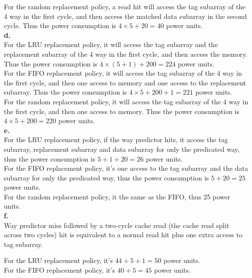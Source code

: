 \documentclass{article}
\begin{document}
For the random replacement policy, a read hit will access the tag subarray of the 4 way in the first cycle, and then access the matched data subarray in the second cycle. Thus the power consumption is $4\times5+20=40$ power units.\\

\noindent\textbf{d.}\\
\indent For the LRU replacement policy, it will access the tag subarray and the replacement subarray of the 4 way in the first cycle, and then access the memory. Thus the power consumption is $4\times(5+1)+200=224$ power units.\\

For the FIFO replacement policy, it will access the tag subarray of the 4 way in the first cycle, and then one access to memory and one access to the replacement subarray. Thus the power consumption is $4\times5+200+1=221$ power units.\\

For the random replacement policy, it will access the tag subarray of the 4 way in the first cycle, and then one access to memory. Thus the power consumption is $4\times5+200=220$ power units.\\

\noindent\textbf{e.}\\
\indent For the LRU replacement policy, if the way predictor hits, it access the tag subarray, replacement subarray and data subarray for only the predicated way, thus the power consumption is $5+1+20=26$ power units.\\

For the FIFO replacement policy, it's one access to the tag subarray and the data subarray for only the predicated way, thus the power consumption is $5+20=25$ power units.\\

For the random replacement policy, it the same as the FIFO, thus 25 power units.\\

\noindent\textbf{f.}\\
\indent Way predictor miss followed by a two-cycle cache read (the cache read split across two cycles) hit is equivalent to a normal read hit plus one extra access to tag subarray.

\indent For the LRU replacement policy, it's $44+5+1=50$ power units.\\

\indent For the FIFO replacement policy, it's $40+5=45$ power units.\\
\end{document}
